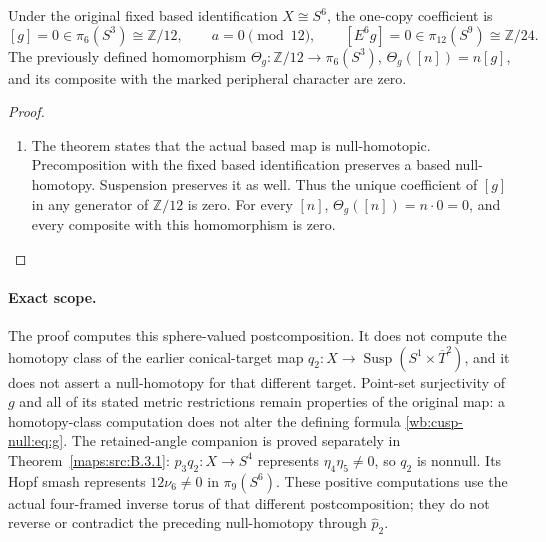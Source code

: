 \begin{corollary}\label{wb:cusp_s12_carrier_homotopy:L567}

Under the original fixed based identification \(X\cong S^6\), the
one-copy coefficient is
\[
 [g]=0\in\pi_6(S^3)\cong\mathbb Z/12,\qquad a=0\pmod{12},\qquad
 [E^6g]=0\in\pi_{12}(S^9)\cong\mathbb Z/24.
\]
The previously defined homomorphism
\(\Theta_g:\mathbb Z/12\to\pi_6(S^3)\), \(\Theta_g([n])=n[g]\), and
its composite with the marked peripheral character are zero.
\end{corollary}


\begin{proof}
\begin{enumerate}[label=\arabic*.,leftmargin=*]
\item The theorem states that the actual based map is null-homotopic.
Precomposition with the fixed based identification preserves a based
null-homotopy. Suspension preserves it as well. Thus the unique
coefficient of \([g]\) in any generator of \(\mathbb Z/12\) is zero.
For every \([n]\), \(\Theta_g([n])=n\cdot0=0\), and every
composite with this homomorphism is zero.
\end{enumerate}
\end{proof}

\paragraph{Exact scope.}
The proof computes this sphere-valued postcomposition. It does not
compute the homotopy class of the earlier conical-target map
\(q_2:X\to\operatorname{Susp}(S^1\times\overline T^2)\), and it
does not assert a null-homotopy for that different target. Point-set
surjectivity of \(g\) and all of its stated metric restrictions remain
properties of the original map: a homotopy-class computation does not
alter the defining formula \eqref{wb:cusp-null:eq:g}.
The retained-angle companion is proved separately in
Theorem~\ref{maps:src:B.3.1}: $p_3q_2:X\to S^4$ represents
$\eta_4\eta_5\ne0$, so $q_2$ is nonnull. Its Hopf smash
represents $12\nu_6\ne0$ in $\pi_9(S^6)$. These positive
computations use the actual four-framed inverse torus of that different
postcomposition; they do not reverse or contradict the preceding
null-homotopy through $\widehat p_2$.





